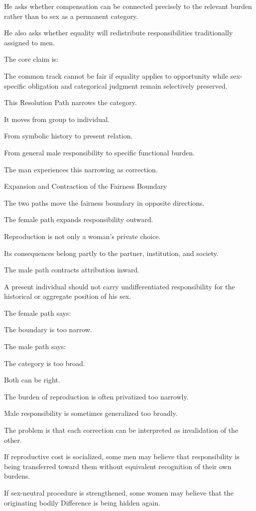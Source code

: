 He asks whether compensation can be connected precisely to the relevant burden rather than to sex as a permanent category.

He also asks whether equality will redistribute responsibilities traditionally assigned to men.

The core claim is:

The common track cannot be fair if equality applies to opportunity while sex-specific obligation and categorical judgment remain selectively preserved.

This Resolution Path narrows the category.

It moves from group to individual.

From symbolic history to present relation.

From general male responsibility to specific functional burden.

The man experiences this narrowing as correction.

Expansion and Contraction of the Fairness Boundary

The two paths move the fairness boundary in opposite directions.

The female path expands responsibility outward.

Reproduction is not only a woman’s private choice.

Its consequences belong partly to the partner, institution, and society.

The male path contracts attribution inward.

A present individual should not carry undifferentiated responsibility for the historical or aggregate position of his sex.

The female path says:

The boundary is too narrow.

The male path says:

The category is too broad.

Both can be right.

The burden of reproduction is often privatized too narrowly.

Male responsibility is sometimes generalized too broadly.

The problem is that each correction can be interpreted as invalidation of the other.

If reproductive cost is socialized, some men may believe that responsibility is being transferred toward them without equivalent recognition of their own burdens.

If sex-neutral procedure is strengthened, some women may believe that the originating bodily Difference is being hidden again.

